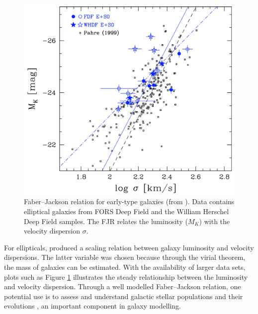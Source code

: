 \documentclass[12pt, twocolumn]{revtex4-1}    %
\begin{document}
\begin{figure}
\includegraphics[width=\linewidth]{introduction/fritz_2009}
\caption{Faber--Jackson relation for early-type galaxies (from \citealt{2009MNRAS.393.1467F}). Data contains elliptical galaxies from FORS Deep Field and the William Herschel Deep Field samples. The FJR relates the luminosity ($M_K$) with the velocity dispersion $\sigma$.}
\label{fig:faber_jackson}
\end{figure}

For ellipticals, \cite{1976ApJ...204..668F} produced a scaling relation between galaxy luminosity and velocity dispersions. The latter variable was chosen because through the virial theorem, the mass of galaxies can be estimated. With the availability of larger data sets, plots such as Figure \ref{fig:faber_jackson} illustrates the steady relationship between the luminosity and velocity dispersion. Through a well modelled Faber--Jackson relation, one potential use is to assess and understand galactic stellar populations and their evolutions \citep{2009MNRAS.393.1467F}, an important component in galaxy modelling.
\end{document}
